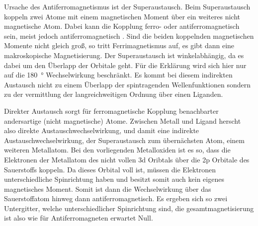         Ursache des Antiferromagnetismus ist der Superaustausch.
            Beim Superaustausch koppeln zwei Atome mit einem magnetischen Moment über ein weiteres nicht magnetische Atom. 
            Dabei kann die Kopplung ferro- oder antiferromagnetisch sein, meist jedoch antiferromagnetisch \cite{AFM_1}.
            Sind die beiden koppelnden magnetischen Momente nicht gleich groß, so tritt Ferrimagnetismus auf, es gibt dann eine makroskopische Magnetisierung.
            Der Superaustausch ist winkelabhängig, da es dabei um den Überlapp der Orbitale geht.
            Für die Erklärung wird sich hier nur auf die \SI{180}{\degree} Wechselwirkung beschränkt.
            Es kommt bei diesem indirekten Austausch nicht zu einem Überlapp der spintragenden Wellenfunktionen sondern zu der vermittlung der langreichweitigen Ordnung über einen Liganden.

            Direkter Austausch sorgt für ferromagnetische Kopplung benachbarter andersartige (nicht magnetische) Atome.
            Zwischen Metall und Ligand herscht also direkte Austauschwechselwirkung, und damit eine indirekte Austauschwechselwirkung, der Superaustausch zum übernächsten Atom, einem weiteren Metallatom.
            Bei den vorliegenden Metalloxiden ist es so, dass die Elektronen der Metallatom des nicht vollen 3d Oribtals über die 2p Orbitale des Sauerstoffs koppeln.
            Da dieses Orbital voll ist, müssen die Elektronen unterschiedliche Spinrichtung haben und besitzt somit auch kein eigenes magnetisches Moment.
            Somit ist dann die Wechselwirkung über das Sauerstoffatom hinweg dann antiferromagnetisch.
            Es ergeben sich so zwei Untergitter, welche unterschiedlicher Spinrichtung sind, die gesamtmagnetisierung ist also wie für Antiferromagneten erwartet Null.
            
            
    
